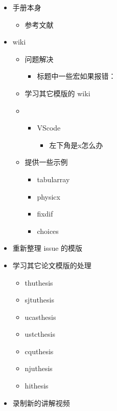 \documentclass{ccnudoc}
\begin{document}
\begin{itemize}
  \item 手册本身
    \begin{itemize}
      \item 参考文献
    \end{itemize}
  \item wiki
    \begin{itemize}
      \item 问题解决
        \begin{itemize}
          \item 标题中一些宏如果报错：
        \end{itemize}
      \item 学习其它模版的 wiki
      \item 
        \begin{itemize}
          \item VScode
            \begin{itemize}
              \item 左下角是x怎么办
            \end{itemize}
        \end{itemize}
      \item 提供一些示例
        \begin{itemize}
          \item tabularray
          \item physicx
          \item fixdif
          \item choices
        \end{itemize}
    \end{itemize}
  \item 重新整理 issue 的模版
  \item 学习其它论文模版的处理
    \begin{itemize}
      \item thuthesis
      \item sjtuthesis
      \item ucasthesis
      \item ustcthesis
      \item cquthesis
      \item njuthesis
      \item hithesis
    \end{itemize}
  \item 录制新的讲解视频
\end{itemize}

\printbibliography
\end{document}
